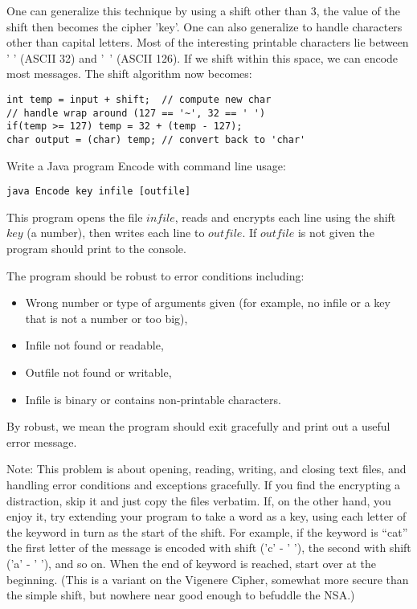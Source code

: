 \documentclass{article}
\newcounter{problem}
\begin{document}
One can generalize this technique by
using a shift other than 3, the value of the shift then becomes the
cipher 'key'. One can also generalize to handle characters other than
capital letters. Most of the interesting printable characters lie
between ' ' (ASCII 32) and '~' (ASCII 126). If we shift within this
space, we can encode most messages. The shift algorithm now becomes:
\begin{verbatim}
int temp = input + shift;  // compute new char
// handle wrap around (127 == '~', 32 == ' ')
if(temp >= 127) temp = 32 + (temp - 127);
char output = (char) temp; // convert back to 'char'
\end{verbatim}

Write a Java program Encode with command line usage:

\begin{verbatim}
java Encode key infile [outfile]
\end{verbatim}

This program opens the file $infile$, reads and encrypts each line
using the shift $key$ (a number), then writes each line to $outfile$.
If $outfile$ is not given the program should print to the console.

The program should be robust to error conditions including:
\begin{itemize}
\setlength{\parskip}{0pt}
\item Wrong number or type of arguments given (for example, no infile or
a key that is not a number or too big),
\item Infile not found or readable,
\item Outfile not found or writable,
\item Infile is binary or contains non-printable characters.
\end{itemize}

By robust, we mean the program should exit gracefully and print out a
useful error message.

Note: This problem is about opening, reading, writing, and closing text files,
and handling error conditions and exceptions gracefully. If you find the
encrypting a distraction, skip it and just copy the files verbatim.
If, on the other hand, you enjoy it, try extending your program to take a 
word as a key, using each letter
of the keyword in turn as the start of the shift. For example, if the keyword
is ``cat'' the first letter of the message is encoded with shift ('c' - ' '),
the second with shift ('a' - ' '), and so on. When the end of keyword is
reached, start over at the beginning. (This is a variant on the
Vigenere Cipher, somewhat more secure than the simple shift, but nowhere
near good enough to befuddle the NSA.)
\end{document}
